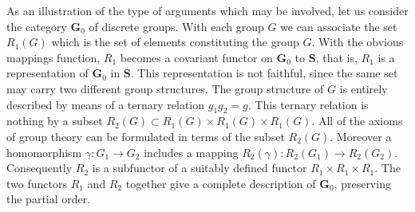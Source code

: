 \documentclass[11pt,a4paper]{report}
\begin{document}
As an illustration of the type of arguments which may be involved, let us consider the category $\mathbf{G}_0$ of
discrete groups. With each group $G$ we can associate the set $R_1(G)$ which is the set of elements constituting
the group $G$. With the obvious mappings function, $R_1$ becomes a covariant functor on $\mathbf{G}_0$ to
$\mathbf{S}$, that is, $R_1$ is a representation of $\mathbf{G}_0$ in $\mathbf{S}$. This representation is not
faithful, since the same set may carry two different group structures. The group structure of $G$ is entirely
described by means of a ternary relation $g_1 g_2 = g$. This ternary relation is nothing by a subset
$R_2(G)\subset R_1(G)\times R_1(G)\times R_1(G)$. All of the axioms of group theory can be formulated in terms
of the subset $R_2(G)$. Moreover a homomorphism $\gamma:G_1\rightarrow G_2$ includes a mapping $R_2(\gamma):
R_2(G_1)\rightarrow R_2(G_2)$. Consequently $R_2$ is a subfunctor of a suitably defined functor
$R_1\times R_1\times R_1$. The two functors $R_1$ and $R_2$ together give a complete description of
$\mathbf{G}_0$, preserving the partial order.
\printbibliography
\end{document}
